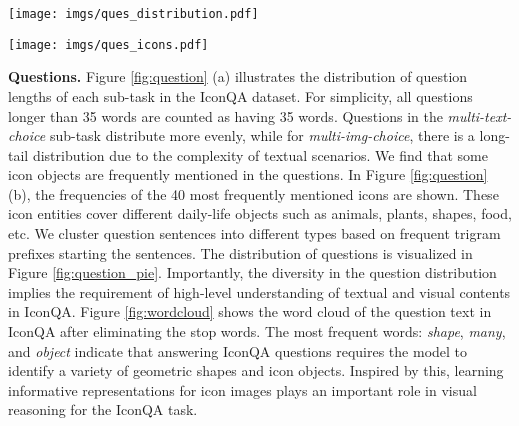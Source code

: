 \documentclass{article}
\begin{document}
\begin{figure*}[t]
    \begin{minipage}{0.27\linewidth}  
        \centering
        \texttt{[image: imgs/ques\_distribution.pdf]}
        \vspace{-5mm}
	\end{minipage}
    \hfill
    \begin{minipage}{0.71\linewidth}  
        \centering
        \texttt{[image: imgs/ques\_icons.pdf]}
        \vspace{-5mm}
	\end{minipage}
	  \vspace{-3mm}
      \caption{ Question statistics based on number of words.  Top 40 icons mentioned in the IconQA question texts and their appearance percentage. These icons cover various types of real-world objects.}
    \label{fig:question}
\end{figure*}


\textbf{Questions.} Figure \ref{fig:question}  (a) illustrates the distribution of question lengths of each sub-task in the IconQA dataset. For simplicity, all questions longer than 35 words are counted as having 35 words. Questions in the \textit{multi-text-choice} sub-task distribute more evenly, while for \textit{multi-img-choice}, there is a long-tail distribution due to the complexity of textual scenarios. We find that some icon objects are frequently mentioned in the questions. In Figure \ref{fig:question} (b), the frequencies of the 40 most frequently mentioned icons are shown. These icon entities cover different daily-life objects such as animals, plants, shapes, food, etc. We cluster question sentences into different types based on frequent trigram prefixes starting the sentences. The distribution of questions is visualized in Figure \ref{fig:question_pie}. Importantly, the diversity in the question distribution implies the requirement of high-level understanding of textual and visual contents in IconQA. Figure \ref{fig:wordcloud} shows the word cloud of the question text in IconQA after eliminating the stop words. The most frequent words: \textit{shape}, \textit{many}, and \textit{object} indicate that answering IconQA questions requires the model to identify a variety of geometric shapes and icon objects. Inspired by this, learning informative representations for icon images plays an important role in visual reasoning for the IconQA task. 
\end{document}

